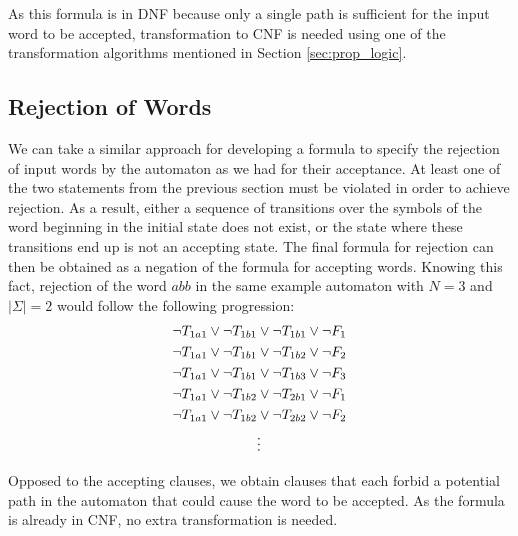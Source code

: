 As this formula is in DNF because only a single path is sufficient for the input word to be accepted, transformation to CNF is needed using one of the transformation algorithms mentioned in Section \ref{sec:prop_logic}.


\subsection{Rejection of Words}

We can take a similar approach for developing a formula to specify the rejection of input words by the automaton as we had for their acceptance. At least one of the two statements from the previous section must be violated in order to achieve rejection. As a result, either a sequence of transitions over the symbols of the word beginning in the initial state does not exist, or the state where these transitions end up is not an accepting state. The final formula for rejection can then be obtained as a negation of the formula for accepting words. Knowing this fact, rejection of the word $abb$ in the same example automaton with $N=3$ and $|\Sigma|=2$ would follow the following progression:
\begin{align*}
    \centering
    \neg T_{1a1} \lor \neg T_{1b1} &\lor \neg T_{1b1} \lor \neg F_1 \\
    \neg T_{1a1} \lor \neg T_{1b1} &\lor \neg T_{1b2} \lor \neg F_2 \\
    \neg T_{1a1} \lor \neg T_{1b1} &\lor \neg T_{1b3} \lor \neg F_3 \\
    \neg T_{1a1} \lor \neg T_{1b2} &\lor \neg T_{2b1} \lor \neg F_1 \\
    \neg T_{1a1} \lor \neg T_{1b2} &\lor \neg T_{2b2} \lor \neg F_2 \\
    & \vdots \notag
\end{align*}

Opposed to the accepting clauses, we obtain clauses that each forbid a potential path in the automaton that could cause the word to be accepted. As the formula is already in CNF, no extra transformation is needed.

